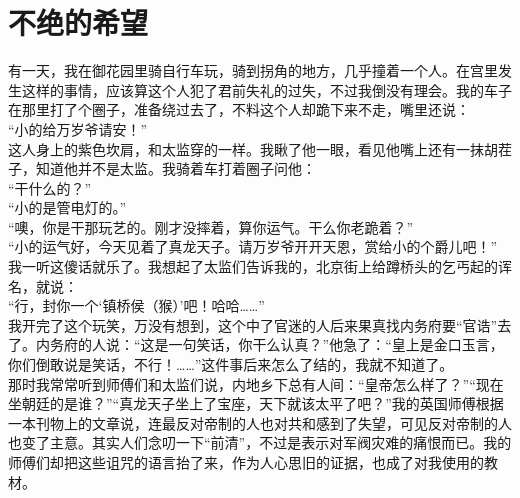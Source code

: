 \fancyhead[RO]{} %
\fancyhead[LE]{} %
\chapter*{不绝的希望}
\thispagestyle{empty}
有一天，我在御花园里骑自行车玩，骑到拐角的地方，几乎撞着一个人。在宫里发生这样的事情，应该算这个人犯了君前失礼的过失，不过我倒没有理会。我的车子在那里打了个圈子，准备绕过去了，不料这个人却跪下来不走，嘴里还说：\\

“小的给万岁爷请安！”\\

这人身上的紫色坎肩，和太监穿的一样。我瞅了他一眼，看见他嘴上还有一抹胡茬子，知道他并不是太监。我骑着车打着圈子问他：\\

“干什么的？”\\

“小的是管电灯的。”\\

“噢，你是干那玩艺的。刚才没摔着，算你运气。干么你老跪着？”\\

“小的运气好，今天见着了真龙天子。请万岁爷开开天恩，赏给小的个爵儿吧！”\\

我一听这傻话就乐了。我想起了太监们告诉我的，北京街上给蹲桥头的乞丐起的诨名，就说：\\

“行，封你一个‘镇桥侯（猴）’吧！哈哈……”\\

我开完了这个玩笑，万没有想到，这个中了官迷的人后来果真找内务府要“官诰”去了。内务府的人说：“这是一句笑话，你干么认真？”他急了：“皇上是金口玉言，你们倒敢说是笑话，不行！……”这件事后来怎么了结的，我就不知道了。\\

那时我常常听到师傅们和太监们说，内地乡下总有人间：“皇帝怎么样了？”“现在坐朝廷的是谁？”“真龙天子坐上了宝座，天下就该太平了吧？”我的英国师傅根据一本刊物上的文章说，连最反对帝制的人也对共和感到了失望，可见反对帝制的人也变了主意。其实人们念叨一下“前清”，不过是表示对军阀灾难的痛恨而已。我的师傅们却把这些诅咒的语言抬了来，作为人心思旧的证据，也成了对我使用的教材。\\

